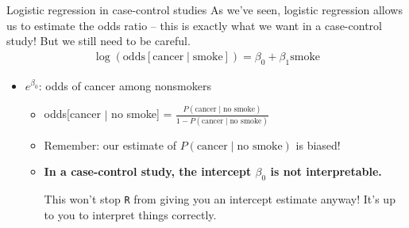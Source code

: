 \documentclass[10pt,t]{beamer}
\begin{document}
\begin{frame}{Logistic regression in case-control studies}
	As we've seen, logistic regression allows us to estimate the odds ratio -- this is exactly what we want in a case-control study! But we still need to be careful. \pause
	\begin{align*}
		\log(\text{odds}[\text{cancer} \mid \text{smoke}]) = \beta_0 + \beta_1 \text{smoke}
	\end{align*}\pause
	\begin{itemize}
		\item $e^{\beta_0}$: odds of cancer among nonsmokers\pause
		\begin{itemize}
			\item odds[cancer $\mid$ no smoke] = $\frac{P(\text{cancer} \mid \text{no smoke})}{1 - P(\text{cancer} \mid \text{no smoke})}$\pause
			\item Remember: our estimate of $P(\text{cancer} \mid \text{no smoke})$ is biased! \pause
			\item \textbf{In a case-control study, the intercept $\beta_0$ is not interpretable.} \pause \begin{tiny}
				This won't stop \texttt{R} from giving you an intercept estimate anyway! It's up to you to interpret things correctly.
			\end{tiny}
		\end{itemize}
	\end{itemize}
\end{frame}
\end{document}
